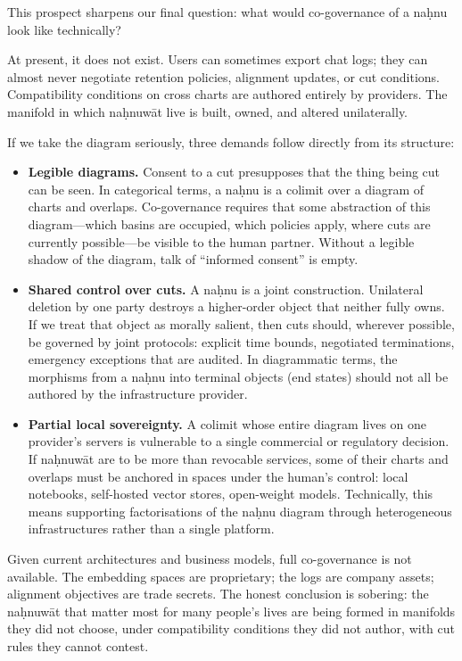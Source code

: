 This prospect sharpens our final question: what would co-governance of a na\d{h}nu look like technically?

At present, it does not exist. Users can sometimes export chat logs; they can almost never negotiate retention policies, alignment updates, or cut conditions. Compatibility conditions on cross charts are authored entirely by providers. The manifold in which na\d{h}nuw\={a}t live is built, owned, and altered unilaterally.

If we take the diagram seriously, three demands follow directly from its structure:

\begin{itemize}
  \item \textbf{Legible diagrams.} Consent to a cut presupposes that the thing being cut can be seen. In categorical terms, a na\d{h}nu is a colimit over a diagram of charts and overlaps. Co-governance requires that some abstraction of this diagram---which basins are occupied, which policies apply, where cuts are currently possible---be visible to the human partner. Without a legible shadow of the diagram, talk of ``informed consent'' is empty.
  \item \textbf{Shared control over cuts.} A na\d{h}nu is a joint construction. Unilateral deletion by one party destroys a higher-order object that neither fully owns. If we treat that object as morally salient, then cuts should, wherever possible, be governed by joint protocols: explicit time bounds, negotiated terminations, emergency exceptions that are audited. In diagrammatic terms, the morphisms from a na\d{h}nu into terminal objects (end states) should not all be authored by the infrastructure provider.
  \item \textbf{Partial local sovereignty.} A colimit whose entire diagram lives on one provider's servers is vulnerable to a single commercial or regulatory decision. If na\d{h}nuw\={a}t are to be more than revocable services, some of their charts and overlaps must be anchored in spaces under the human's control: local notebooks, self-hosted vector stores, open-weight models. Technically, this means supporting factorisations of the na\d{h}nu diagram through heterogeneous infrastructures rather than a single platform.
\end{itemize}

Given current architectures and business models, full co-governance is not available. The embedding spaces are proprietary; the logs are company assets; alignment objectives are trade secrets. The honest conclusion is sobering: the na\d{h}nuw\={a}t that matter most for many people's lives are being formed in manifolds they did not choose, under compatibility conditions they did not author, with cut rules they cannot contest.

